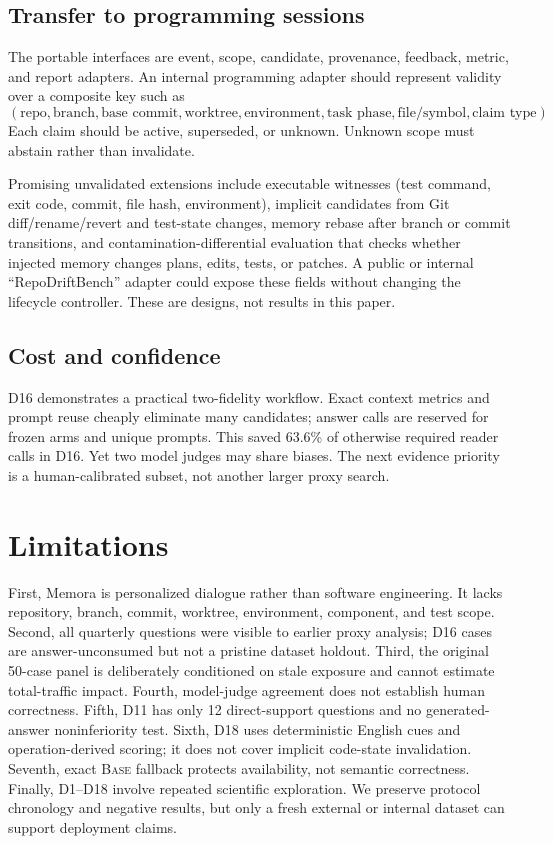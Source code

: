 \documentclass[10pt]{article}
\newcommand{\base}{\textsc{Base}\xspace}
\begin{document}
\subsection{Transfer to programming sessions}

The portable interfaces are event, scope, candidate, provenance, feedback, metric, and report adapters. An internal programming adapter should represent validity over a composite key such as
\[
(\text{repo},\text{branch},\text{base commit},\text{worktree},\text{environment},
\text{task phase},\text{file/symbol},\text{claim type}).
\]
Each claim should be active, superseded, or unknown. Unknown scope must abstain rather than invalidate.

Promising unvalidated extensions include executable witnesses (test command, exit code, commit, file hash, environment), implicit candidates from Git diff/rename/revert and test-state changes, memory rebase after branch or commit transitions, and contamination-differential evaluation that checks whether injected memory changes plans, edits, tests, or patches. A public or internal ``RepoDriftBench'' adapter could expose these fields without changing the lifecycle controller. These are designs, not results in this paper.

\subsection{Cost and confidence}

D16 demonstrates a practical two-fidelity workflow. Exact context metrics and prompt reuse cheaply eliminate many candidates; answer calls are reserved for frozen arms and unique prompts. This saved 63.6\% of otherwise required reader calls in D16. Yet two model judges may share biases. The next evidence priority is a human-calibrated subset, not another larger proxy search.

\section{Limitations}

First, Memora is personalized dialogue rather than software engineering. It lacks repository, branch, commit, worktree, environment, component, and test scope. Second, all quarterly questions were visible to earlier proxy analysis; D16 cases are answer-unconsumed but not a pristine dataset holdout. Third, the original 50-case panel is deliberately conditioned on stale exposure and cannot estimate total-traffic impact. Fourth, model-judge agreement does not establish human correctness. Fifth, D11 has only 12 direct-support questions and no generated-answer noninferiority test. Sixth, D18 uses deterministic English cues and operation-derived scoring; it does not cover implicit code-state invalidation. Seventh, exact \base fallback protects availability, not semantic correctness. Finally, D1--D18 involve repeated scientific exploration. We preserve protocol chronology and negative results, but only a fresh external or internal dataset can support deployment claims.
\end{document}
